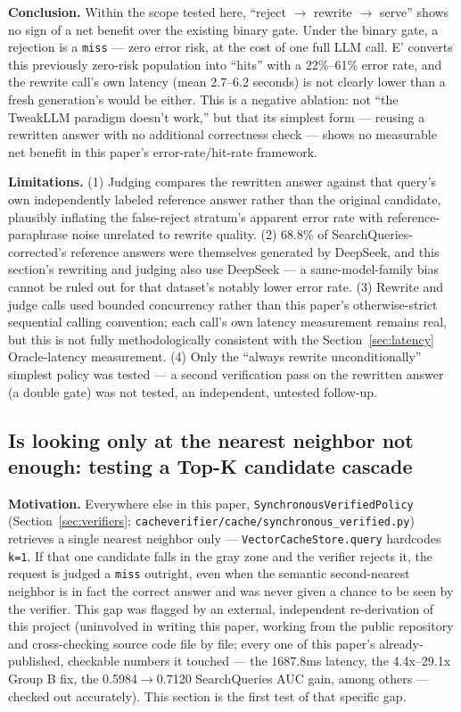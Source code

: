 \documentclass[11pt]{article}
\begin{document}
\textbf{Conclusion.} Within the scope tested here, ``reject $\to$ rewrite $\to$ serve'' shows no sign of a net benefit over the existing binary gate. Under the binary gate, a rejection is a \texttt{miss} --- zero error risk, at the cost of one full LLM call. E' converts this previously zero-risk population into ``hits'' with a 22\%--61\% error rate, and the rewrite call's own latency (mean 2.7--6.2 seconds) is not clearly lower than a fresh generation's would be either. This is a negative ablation: not ``the TweakLLM paradigm doesn't work,'' but that its simplest form --- reusing a rewritten answer with no additional correctness check --- shows no measurable net benefit in this paper's error-rate/hit-rate framework.

\textbf{Limitations.} (1) Judging compares the rewritten answer against that query's own independently labeled reference answer rather than the original candidate, plausibly inflating the false-reject stratum's apparent error rate with reference-paraphrase noise unrelated to rewrite quality. (2) 68.8\% of SearchQueries-corrected's reference answers were themselves generated by DeepSeek, and this section's rewriting and judging also use DeepSeek --- a same-model-family bias cannot be ruled out for that dataset's notably lower error rate. (3) Rewrite and judge calls used bounded concurrency rather than this paper's otherwise-strict sequential calling convention; each call's own latency measurement remains real, but this is not fully methodologically consistent with the Section~\ref{sec:latency} Oracle-latency measurement. (4) Only the ``always rewrite unconditionally'' simplest policy was tested --- a second verification pass on the rewritten answer (a double gate) was not tested, an independent, untested follow-up.

\subsection{Is looking only at the nearest neighbor not enough: testing a Top-K candidate cascade}
\label{sec:topk}

\textbf{Motivation.} Everywhere else in this paper, \texttt{Synchronous\allowbreak{}Verified\allowbreak{}Policy} (Section~\ref{sec:verifiers}; \texttt{cacheverifier/\allowbreak{}cache/\allowbreak{}synchronous\_\allowbreak{}verified.\allowbreak{}py}) retrieves a single nearest neighbor only --- \texttt{Vector\allowbreak{}Cache\allowbreak{}Store.\allowbreak{}query} hardcodes \texttt{k=1}. If that one candidate falls in the gray zone and the verifier rejects it, the request is judged a \texttt{miss} outright, even when the semantic second-nearest neighbor is in fact the correct answer and was never given a chance to be seen by the verifier. This gap was flagged by an external, independent re-derivation of this project (uninvolved in writing this paper, working from the public repository and cross-checking source code file by file; every one of this paper's already-published, checkable numbers it touched --- the 1687.8ms latency, the 4.4x--29.1x Group B fix, the 0.5984$\to$0.7120 SearchQueries AUC gain, among others --- checked out accurately). This section is the first test of that specific gap.
\end{document}
